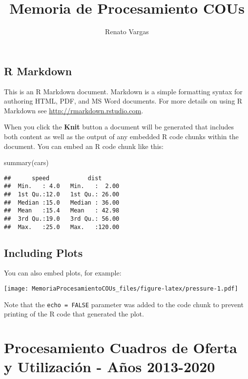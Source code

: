 \documentclass[
]{article}
\title{Memoria de Procesamiento COUs}
\author{Renato Vargas}
\date{}
\newenvironment{Shaded}{\begin{snugshade}}{\end{snugshade}}
\newcommand{\FunctionTok}[1]{\textcolor[rgb]{0.00,0.00,0.00}{#1}}
\newcommand{\NormalTok}[1]{#1}
\begin{document}
\maketitle

\hypertarget{r-markdown}{%
\subsection{R Markdown}\label{r-markdown}}

This is an R Markdown document. Markdown is a simple formatting syntax
for authoring HTML, PDF, and MS Word documents. For more details on
using R Markdown see \url{http://rmarkdown.rstudio.com}.

When you click the \textbf{Knit} button a document will be generated
that includes both content as well as the output of any embedded R code
chunks within the document. You can embed an R code chunk like this:

\begin{Shaded}
\begin{Highlighting}[]
\FunctionTok{summary}\NormalTok{(cars)}
\end{Highlighting}
\end{Shaded}

\begin{verbatim}
##      speed           dist       
##  Min.   : 4.0   Min.   :  2.00  
##  1st Qu.:12.0   1st Qu.: 26.00  
##  Median :15.0   Median : 36.00  
##  Mean   :15.4   Mean   : 42.98  
##  3rd Qu.:19.0   3rd Qu.: 56.00  
##  Max.   :25.0   Max.   :120.00
\end{verbatim}

\hypertarget{including-plots}{%
\subsection{Including Plots}\label{including-plots}}

You can also embed plots, for example:

\texttt{[image: MemoriaProcesamientoCOUs\_files/figure-latex/pressure-1.pdf]}

Note that the \texttt{echo\ =\ FALSE} parameter was added to the code
chunk to prevent printing of the R code that generated the plot.

\hypertarget{procesamiento-cuadros-de-oferta-y-utilizaciuxf3n---auxf1os-2013-2020}{%
\section{Procesamiento Cuadros de Oferta y Utilización - Años
2013-2020}\label{procesamiento-cuadros-de-oferta-y-utilizaciuxf3n---auxf1os-2013-2020}}
\end{document}
